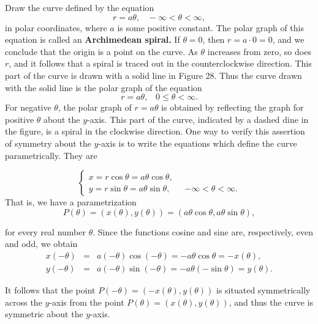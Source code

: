\begin{example} Draw the curve defined by the equation
$$
r = a \theta,  \;\;\; - \infty  < \theta < \infty,
$$
\noindent in polar coordinates, where $a$ is some positive constant. The polar graph of this equation is called an \textbf{Archimedean spiral.} If $\theta = 0$, then $r = a \cdot 0 = 0$, and we conclude that the origin is a point on the curve. As $\theta$ increases from zero, so does $r$, and it follows that a spiral is traced out in the counterclockwise direction. This part of the curve is drawn with a solid line in Figure 28. Thus the curve drawn with the solid line is the polar graph of the equation
$$
r = a\theta, \;\;\; 0 \leq \theta < \infty.
$$
\noindent For negative $\theta$, the polar graph of $r = a\theta$ is obtained by reflecting the graph for positive $\theta$ about the $y$-axis. This part of the curve, indicated by a dashed dine in the figure, is a spiral in the clockwise direction. One way to verify this assertion of symmetry about the $y$-axis is to write the equations which define the curve parametrically. They are

$$
\left \{ \begin{array}{ll}
x = r \cos \theta = a\theta \cos \theta, &\\
y = r \sin \theta = a\theta \sin \theta, \;\;\;& -\infty < \theta < \infty .
\end{array}
\right .
$$
\noindent That is, we have a parametrization
$$
P(\theta) = (x(\theta), y(\theta)) = (a\theta \cos \theta, a\theta \sin \theta),
$$


\noindent for every real number $\theta$. Since the functions cosine and sine are, respectively, even and odd, we obtain 
\begin{eqnarray*}
x(-\theta) &=& a(-\theta) \cos(-\theta) = -a\theta \cos \theta = -x(\theta), \\
y(-\theta) &=& a(-\theta) \sin(-\theta) = -a\theta (-\sin \theta) = y(\theta).
\end{eqnarray*}

\noindent It follows that the point $P(-\theta) = (-x(\theta), y(\theta))$ is situated symmetrically across the $y$-axis from the point $P(\theta) = (x(\theta), y(\theta))$, and thus the curve is symmetric about the $y$-axis.
\end{example}

